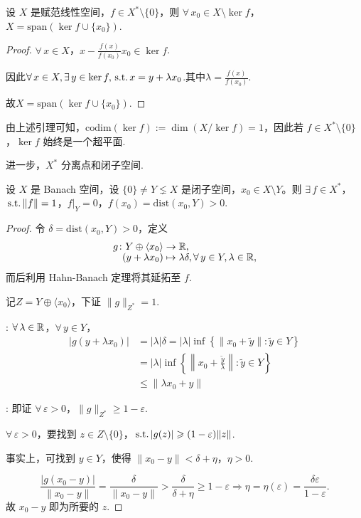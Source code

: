 \begin{lemma}[]
    设 $X$ 是赋范线性空间，$f \in X^* \setminus \{0\}$，则 $\forall\, x_0 \in X \setminus \ker f$，$X = \mathrm{span}(\ker f \cup \{x_0\})$.
\end{lemma}

\begin{proof}
    $\forall\, x \in X$，$x - \frac{f(x)}{f(x_0)} x_0 \in \ker f$.\par
    因此$\forall\, x\in X,\exists\, y\in\ker f,\operatorname{\,\text{s.t.}} x=y+\lambda x_0$.其中$\lambda=\frac{f(x)}{f(x_0)}$.\par
    故$X = \mathrm{span}(\ker f \cup \{x_0\})$.
\end{proof}
由上述引理可知，$\mathrm{codim}(\ker f) := \dim (X / \ker f) = 1$，因此若 $f \in X^* \setminus \{0\}$，$\ker f$ 始终是一个超平面.\par
进一步，$X^*$ 分离点和闭子空间.\par
\begin{lemma}
设 $X$ 是 Banach 空间，设 $\{0\} \neq Y \lneq X$ 是闭子空间，$x_0 \in X \setminus Y$。则 $\exists\, f \in X^*$，$\operatorname{\,\text{s.t.}} \|f\| = 1$，$f|_Y = 0$，$f(x_0) = \mathrm{dist}(x_0, Y) > 0$.
\end{lemma}
\begin{proof}
    令 $\delta = \mathrm{dist}(x_0, Y) > 0$，定义
    \begin{align*}
        g\colon Y \oplus \langle x_0 \rangle &\to \mathbb{R},\\[-4pt]
        (y + \lambda x_0) &\mapsto \lambda \delta,\forall\, y \in Y, \lambda \in \mathbb{R},
    \end{align*}
    而后利用 Hahn-Banach 定理将其延拓至 $f$.\par
    记$Z = Y \oplus \langle x_0 \rangle$，下证 $\|g\|_{Z^*} = 1$.\par
    : $\forall\, \lambda \in \mathbb{R}$，$\forall\, y \in Y$，\begin{align*}
        |g(y + \lambda x_0)| &= |\lambda| \delta = |\lambda| \inf \left\{\left\|x_0 + \tilde{y}\right\| : \tilde{y} \in Y\right\}\\ 
        &= |\lambda| \inf \left\{\left\|x_0 + \frac{\tilde{y}}{\lambda}\right\| : \tilde{y} \in Y\right\} \\
        &\leq \|\lambda x_0 + y\|
    \end{align*}\par
    : 即证 $\forall\, \varepsilon > 0$，$\|g\|_{Z^*} \geq 1 - \varepsilon$.\par
    $\forall\, \varepsilon > 0$，要找到 $z \in Z \setminus \{0\}$，$\operatorname{\,\text{s.t.}} |g(z)| \geqslant (1 - \varepsilon)\|z\|$.\par
    事实上，可找到 $y \in Y$，使得 $\|x_0 - y\| < \delta + \eta$，$\eta > 0$.\par
    \begin{equation*}
        \frac{|g(x_0 - y)|}{\|x_0 - y\|} = \frac{\delta}{\|x_0 - y\|} > \frac{\delta}{\delta + \eta} \geq 1 - \varepsilon \Rightarrow \eta = \eta(\varepsilon) = \frac{\delta \varepsilon}{1 - \varepsilon}.
    \end{equation*}
    故 $x_0 - y$ 即为所要的 $z$.
\end{proof}

